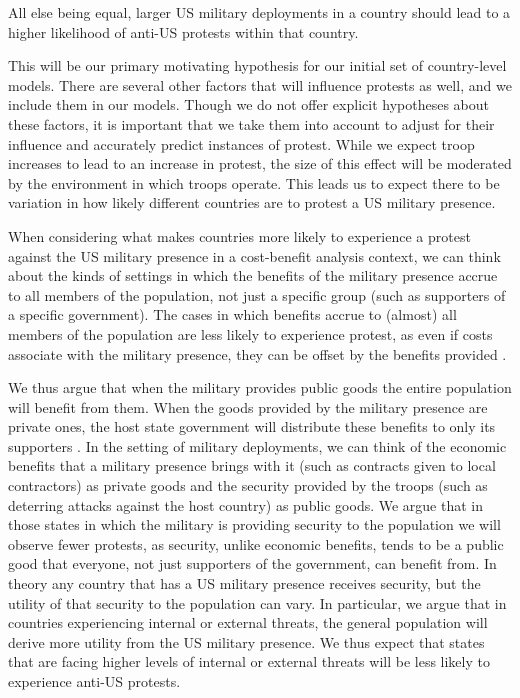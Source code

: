 

\begin{hyp}
	All else being equal, larger US military deployments in a country should lead to a higher likelihood of anti-US protests within that country.
\end{hyp}

This will be our primary motivating hypothesis for our initial set of country-level models. There are several other factors that will influence protests as well, and we include them in our models. Though we do not offer explicit hypotheses about these factors, it is important that we take them into account to adjust for their influence and accurately predict instances of protest. While we expect troop increases to lead to an increase in protest, the size of this effect will be moderated by the environment in which troops operate. This leads us to expect there to be variation in how likely different countries are to protest a US military presence.  


When considering what makes countries more likely to experience a protest against the US military presence in a cost-benefit analysis context, we can think about the kinds of settings in which the benefits of the military presence accrue to all members of the population, not just a specific group (such as supporters of a specific government). The cases in which benefits accrue to (almost) all members of the population are less likely to experience protest, as even if costs associate with the military presence, they can be offset by the benefits provided \cite{Bitar2016}. 

We thus argue that when the military provides public goods the entire population will benefit from them.  When the goods provided by the military presence are private ones, the host state government will distribute these benefits to only its supporters \cite{demesquita2005}. In the setting of military deployments, we can think of the economic benefits that a military presence brings with it (such as contracts given to local contractors) as private goods and the security provided by the troops (such as deterring attacks against the host country) as public goods. We argue that in those states in which the military is providing security to the population we will observe fewer protests, as security, unlike economic benefits, tends to be a public good that everyone, not just supporters of the government, can benefit from. In theory any country that has a US military presence receives security, but the utility of that security to the population can vary. In particular, we argue that in countries experiencing internal or external threats, the general population will derive more utility from the US military presence. We thus expect that states that are facing higher levels of internal or external threats will be less likely to experience anti-US protests.



